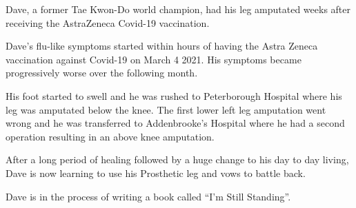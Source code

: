 Dave, a former Tae Kwon-Do world champion, had his leg amputated weeks after
receiving the AstraZeneca Covid-19 vaccination.

Dave’s flu-like symptoms started within hours of having the Astra Zeneca
vaccination against Covid-19 on March 4 2021. His symptoms became progressively
worse over the following month.

His foot started to swell and he was rushed to Peterborough Hospital where his
leg was amputated below the knee. The first lower left leg amputation went wrong
and he was transferred to Addenbrooke’s Hospital where he had a second operation
resulting in an above knee amputation.

After a long period of healing followed by a huge change to his day to day
living, Dave is now learning to use his Prosthetic leg and vows to battle back.

Dave is in the process of writing a book called “I’m Still Standing”.

